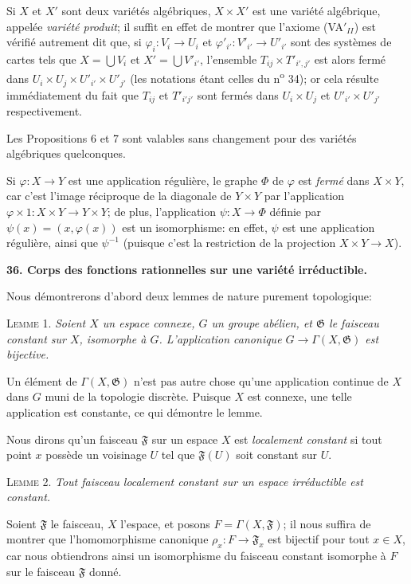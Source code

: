 Si $X$ et $X'$ sont deux variétés algébriques, $X \times X'$ est une variété algébrique, appelée \textit{variété produit}; il suffit en effet de montrer que l'axiome (VA$'_{II}$) est vérifié autrement dit que, si $\varphi_i : V_i \to U_i$ et $\varphi'_{i'} : V'_{i'} \to U'_{i'}$ sont des systèmes de cartes tels que $X = \bigcup V_i$ et $X' = \bigcup V'_{i'}$, l'ensemble $T_{ij} \times T'_{i',j'}$ est alors fermé dans $U_i \times U_j \times U'_{i'} \times U'_{j'}$ (les notations étant celles du n\textsuperscript{o} 34); or cela résulte immédiatement du fait que $T_{ij}$ et $T'_{i'j'}$ sont fermés dans $U_i \times U_j$ et $U'_{i'} \times U'_{j'}$ respectivement.

Les Propositions 6 et 7 sont valables sans changement pour des variétés algébriques quelconques.

Si $\varphi : X \to Y$ est une application régulière, le graphe $\Phi$ de $\varphi$ est \textit{fermé} dans $X \times Y$, car c'est l'image réciproque de la diagonale de $Y \times Y$ par l'application $\varphi \times 1 : X \times Y \to Y \times Y$; de plus, l'application $\psi : X \to \Phi$ définie par $\psi(x) = (x, \varphi(x))$ est un isomorphisme: en effet, $\psi$ est une application régulière, ainsi que $\psi^{-1}$ (puisque c'est la restriction de la projection $X \times Y \to X$).


\textbf{36. Corps des fonctions rationnelles sur une variété irréductible.}

Nous démontrerons d'abord deux lemmes de nature purement topologique:



\textsc{Lemme} 1. \textit{Soient $X$ un espace connexe, $G$ un groupe abélien, et $\mathfrak{G}$ le faisceau constant sur $X$, isomorphe à $G$. L'application canonique $G \to \Gamma(X, \mathfrak{G})$ est bijective.}

Un élément de $\Gamma(X, \mathfrak{G})$ n'est pas autre chose qu'une application continue de $X$ dans $G$ muni de la topologie discrète. Puisque $X$ est connexe, une telle application est constante, ce qui démontre le lemme.

Nous dirons qu'un faisceau $\mathfrak{F}$ sur un espace $X$ est \textit{localement constant} si tout point $x$ possède un voisinage $U$ tel que $\mathfrak{F}(U)$ soit constant sur $U$.

\textsc{Lemme} 2. \textit{Tout faisceau localement constant sur un espace irréductible est constant.}

Soient $\mathfrak{F}$ le faisceau, $X$ l'espace, et posons $F = \Gamma(X, \mathfrak{F})$; il nous suffira de montrer que l'homomorphisme canonique $\rho_x\colon F \to \mathfrak{F}_x$ est bijectif pour tout $x \in X$, car nous obtiendrons ainsi un isomorphisme du faisceau constant isomorphe à $F$ sur le faisceau $\mathfrak{F}$ donné.

